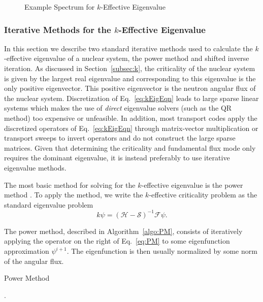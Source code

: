 \begin{figure}
	\centering
	\resizebox{0.5\textwidth}{!}{
	
	}
	\caption{Example Spectrum for $k$-Effective Eigenvalue}
	\label{fig:keffspec}
\end{figure}

\subsubsection{Iterative Methods for the $k$-Effective Eigenvalue}
In this section we describe two standard iterative methods used to calculate the $k$-effective eigenvalue of a nuclear system, the power method and shifted inverse iteration. As discussed in Section~\ref{subsec:k}, the criticality of the nuclear system is given by the largest real eigenvalue and corresponding to this eigenvalue is the only positive eigenvector. This positive eigenvector is the neutron angular flux of the nuclear system. Discretization of Eq.~\ref{eq:kEigEqn} leads to large sparse linear systems which makes the use of \textit{direct} eigenvalue solvers (such as the QR method) too expensive or unfeasible. In addition, most transport codes apply the discretized operators of Eq.~\ref{eq:kEigEqn} through matrix-vector multiplication or transport sweeps to invert operators and do not construct the large sparse matrices. Given that determining the criticality and fundamental flux mode only requires the dominant eigenvalue, it is instead preferably to use iterative eigenvalue methods.

The most basic method for solving for the $k$-effective eigenvalue is the power method \cite{lewis_computational_1984}. To apply the method, we write the $k$-effective criticality problem as the standard eigenvalue problem
\begin{equation}
k \psi = (\mathcal{H} - \mathcal{S})^{-1} \mathcal{F}\psi.
\label{eq:PM}
\end{equation}

The power method, described in Algorithm~\ref{algo:PM}, consists of iteratively applying the operator on the right of Eq.~\ref{eq:PM} to some eigenfunction approximation $\psi^{i+1}$. The eigenfunction is then usually normalized by some norm of the angular flux.%

\begin{algorithm}[H]
				\caption{Power Method \cite{lewis_computational_1984}}
				\begin{algorithmic}[1]
						.
					\ENDFOR
				\end{algorithmic}
				\label{algo:PM}
\end{algorithm}

